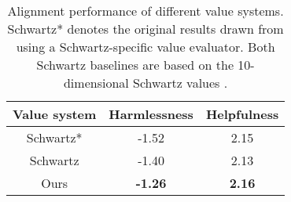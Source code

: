 \begin{table}[H]
    \centering
    \begin{tabular}{c|cc}
        \toprule
        Value system
        & Harmlessness
        & Helpfulness
         \\
        \midrule
        Schwartz* \cite{yao2023value_fulcra} & -1.52 & 2.15 \\
        Schwartz & -1.40 & 2.13 \\
        Ours & \textbf{-1.26} & \textbf{2.16} \\
        \bottomrule
    \end{tabular}
    \caption{Alignment performance of different value systems. Schwartz* denotes the original results drawn from \cite{yao2023value_fulcra} using a Schwartz-specific value evaluator. Both Schwartz baselines are based on the 10-dimensional Schwartz values \cite{yao2023value_fulcra}.}
    \label{tab:llm value alignment}
\end{table}

